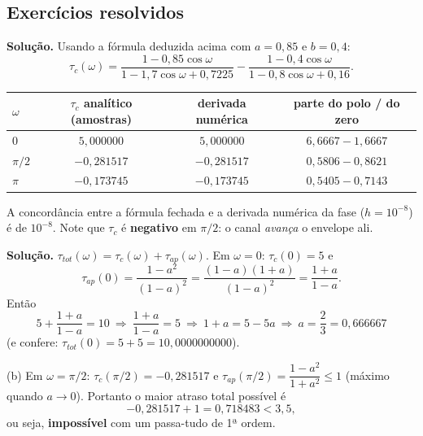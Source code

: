 \subsection*{Exercícios resolvidos}


\textbf{Solução.} Usando a fórmula deduzida acima com $a=0{,}85$ e $b=0{,}4$:
\[
  \tau_c(\omega)=\frac{1-0{,}85\cos\omega}{1-1{,}7\cos\omega+0{,}7225}
  -\frac{1-0{,}4\cos\omega}{1-0{,}8\cos\omega+0{,}16}.
\]
\begin{center}
\begin{tabular}{lccc}
\toprule
$\omega$ & $\tau_c$ analítico (amostras) & derivada numérica & parte do polo / do zero\\
\midrule
$0$      & $5{,}000000$ & $5{,}000000$ & $6{,}6667-1{,}6667$\\
$\pi/2$  & $-0{,}281517$ & $-0{,}281517$ & $0{,}5806-0{,}8621$\\
$\pi$    & $-0{,}173745$ & $-0{,}173745$ & $0{,}5405-0{,}7143$\\
\bottomrule
\end{tabular}
\end{center}
A concordância entre a fórmula fechada e a derivada numérica da fase
($h=10^{-8}$) é de $10^{-8}$. Note que $\tau_c$ é \textbf{negativo} em
$\pi/2$: o canal \emph{avança} o envelope ali.



\textbf{Solução.} $\tau_{tot}(\omega)=\tau_c(\omega)+\tau_{ap}(\omega)$.
Em $\omega=0$: $\tau_c(0)=5$ e
\[
  \tau_{ap}(0)=\frac{1-a^{2}}{(1-a)^{2}}=\frac{(1-a)(1+a)}{(1-a)^{2}}
            =\frac{1+a}{1-a}.
\]
Então
\[
  5+\frac{1+a}{1-a}=10\ \Longrightarrow\ \frac{1+a}{1-a}=5
  \ \Longrightarrow\ 1+a=5-5a\ \Longrightarrow\ \boxed{a=\frac{2}{3}=0{,}666667}
\]
(e confere: $\tau_{tot}(0)=5+5=10{,}0000000000$).

(b) Em $\omega=\pi/2$: $\tau_c(\pi/2)=-0{,}281517$ e
$\tau_{ap}(\pi/2)=\dfrac{1-a^{2}}{1+a^{2}}\le1$ (máximo quando $a\to0$).
Portanto o maior atraso total possível é
\[
  -0{,}281517+1=0{,}718483<3{,}5 ,
\]
ou seja, \textbf{impossível} com um passa-tudo de 1ª ordem.

